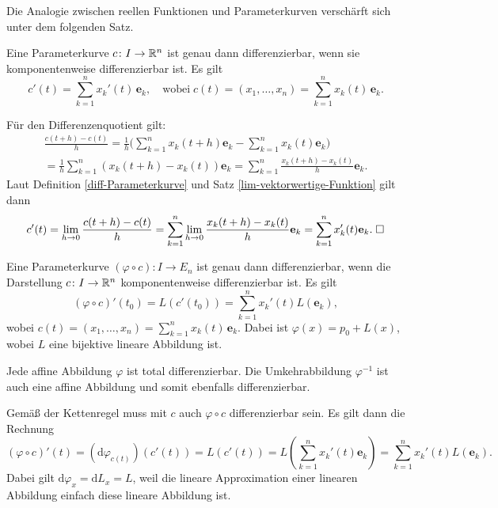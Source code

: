 \noindent
Die Analogie zwischen reellen Funktionen und Parameterkurven
verschärft sich unter dem folgenden Satz.

\pagebreak
\begin{theorem}
Eine Parameterkurve $c\colon I\to\mathbb R^n$ ist genau dann
differenzierbar, wenn sie komponentenweise differenzierbar
ist. Es gilt
\begin{equation}
c'(t) = \sum_{k=1}^n x_k'(t)\,\mathbf e_k,
\quad\text{wobei}\; c(t)=(x_1,\ldots,x_n)=\sum_{k=1}^n x_k(t)\,\mathbf e_k.
\end{equation}
\end{theorem}

\noindent{}
Für den Differenzenquotient gilt:
\begin{gather}
\frac{c(t+h)-c(t)}{h}
= \frac{1}{h}\bigg(\sum_{k=1}^n x_k(t+h)\mathbf e_k-\sum_{k=1}^n x_k(t)\mathbf e_k\bigg)\\
= \frac{1}{h}\sum_{k=1}^n (x_k(t+h)-x_k(t))\mathbf e_k
= \sum_{k=1}^n \frac{x_k(t+h)-x_k(t)}{h}\mathbf e_k.
\end{gather}
Laut Definition \ref{diff-Parameterkurve} und
Satz \ref{lim-vektorwertige-Funktion} gilt dann
\begin{equation}
c'(t) = \lim_{h\to 0}\frac{c(t+h)-c(t)}{h}
= \sum_{k=1}^n \lim_{h\to 0}\frac{x_k(t+h)-x_k(t)}{h}\mathbf e_k
= \sum_{k=1}^n x_k'(t)\mathbf e_k.\;\Box
\end{equation}

\begin{theorem}
Eine Parameterkurve $(\varphi\circ c)\colon I\to E_n$ ist genau dann
differenzierbar, wenn die Darstellung $c\colon I\to\mathbb R^n$
komponentenweise differenzierbar ist. Es gilt
\begin{equation}
(\varphi\circ c)'(t_0) = L(c'(t_0))
= \sum_{k=1}^n x_k'(t) L(\mathbf e_k),
\end{equation}
wobei $c(t) = (x_1,\ldots,x_n) = \sum_{k=1}^n x_k(t)\,\mathbf e_k$.
Dabei ist $\varphi(x) = p_0+L(x)$, wobei $L$ eine bijektive lineare
Abbildung ist.
\end{theorem}

\noindent{}
Jede affine Abbildung $\varphi$ ist total differenzierbar. Die
Umkehrabbildung $\varphi^{-1}$ ist auch eine affine Abbildung und
somit ebenfalls differenzierbar.

Gemäß der Kettenregel muss mit $c$ auch $\varphi\circ c$
differenzierbar sein. Es gilt dann die Rechnung%
\begin{equation}
(\varphi\circ c)'(t) = (\mathrm d\varphi_{c(t)})(c'(t))
= L(c'(t)) = L(\sum_{k=1}^n x_k'(t)\mathbf e_k)
= \sum_{k=1}^n x_k'(t)L(\mathbf e_k).
\end{equation}
Dabei gilt $\mathrm d\varphi_x = \mathrm dL_x = L$, weil die lineare
Approximation einer linearen Abbildung einfach diese lineare Abbildung
ist.


